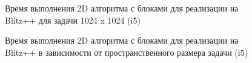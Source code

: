 \documentclass[10pt]{article}
\begin{document}
\clearpage
\newpage
\begin{figure}[h]
\begin{minipage}[h]{1\textwidth}
\end{minipage}
\caption{Время выполнения 2D алгоритма с блоками для реализации на Blitz++ 
  для задачи 1024 x 1024 (i5)}
\label{1024_i5}
\end{figure}
\begin{figure}[h]
\begin{minipage}[h]{1\textwidth}
\end{minipage}
\caption{Время выполнения 2D алгоритма с блоками для реализации на Blitz++
  в зависимости от пространственного размера задачи (i5)}
\label{2D_blocks_i5}
\end{figure}
\clearpage
\newpage
\end{document}

